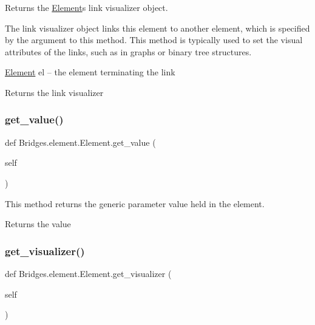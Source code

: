 Returns the \mbox{\hyperlink{class_bridges_1_1element_1_1_element}{Element}}\textquotesingle{}s link visualizer object. 

The link visualizer object links this element to another element, which is specified by the argument to this method. This method is typically used to set the visual attributes of the links, such as in graphs or binary tree structures.

\mbox{\hyperlink{class_bridges_1_1element_1_1_element}{Element}} el -- the element terminating the link

\begin{DoxyReturn}{Returns}
the link visualizer 
\end{DoxyReturn}
\mbox{\label{class_bridges_1_1element_1_1_element_a823d51c9beb771d1e8286160ae6b7db3}} 
\subsubsection{\texorpdfstring{get\+\_\+value()}{get\_value()}}
{\footnotesize\ttfamily def Bridges.\+element.\+Element.\+get\+\_\+value (\begin{DoxyParamCaption}\item[{}]{self }\end{DoxyParamCaption})}



This method returns the generic parameter value held in the element. 

\begin{DoxyReturn}{Returns}
the value 
\end{DoxyReturn}
\mbox{\label{class_bridges_1_1element_1_1_element_a0f9c10a5424253aa27f2737e9d1c5411}} 
\subsubsection{\texorpdfstring{get\+\_\+visualizer()}{get\_visualizer()}}
{\footnotesize\ttfamily def Bridges.\+element.\+Element.\+get\+\_\+visualizer (\begin{DoxyParamCaption}\item[{}]{self }\end{DoxyParamCaption})}



